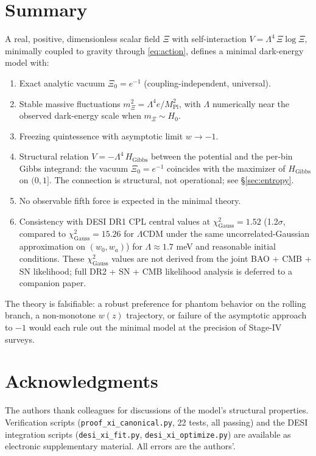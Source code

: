 \documentclass[11pt,reqno]{amsart}
\theoremstyle{plain}
\theoremstyle{definition}
\theoremstyle{remark}
\newcommand{\Pl}{\mathrm{Pl}}
\newcommand{\Gibbs}{\mathrm{Gibbs}}
\begin{document}
\section{Summary}

A real, positive, dimensionless scalar field $\Xi$ with self-interaction
$V = \Lambda^{4}\,\Xi\log\Xi$, minimally coupled to gravity through
\eqref{eq:action}, defines a minimal dark-energy model with:
\begin{enumerate}
  \item Exact analytic vacuum $\Xi_0 = e^{-1}$
        (coupling-independent, universal).
  \item Stable massive fluctuations $m_\Xi^{2} = \Lambda^{4} e / M_\Pl^{2}$,
        with $\Lambda$ numerically near the observed dark-energy scale
        when $m_\Xi \sim H_0$.
  \item Freezing quintessence with asymptotic limit $w \to -1$.
  \item Structural relation $V = -\Lambda^{4}\,H_{\Gibbs}$ between the
        potential and the per-bin Gibbs integrand: the vacuum
        $\Xi_0 = e^{-1}$ coincides with the maximizer of $H_{\Gibbs}$
        on $(0,1]$. The connection is structural, not operational; see
        \S\ref{sec:entropy}.
  \item No observable fifth force is expected in the minimal theory.
  \item Consistency with DESI DR1 CPL central values at
        $\chi^{2}_{\text{Gauss}} = 1.52$ (1.2$\sigma$, compared to
        $\chi^{2}_{\text{Gauss}} = 15.26$ for $\Lambda$CDM under the
        same uncorrelated-Gaussian approximation on $(w_0,w_a)$) for
        $\Lambda \approx 1.7$ meV and reasonable initial conditions.
        These $\chi^{2}_{\text{Gauss}}$ values are not derived from the
        joint BAO + CMB + SN likelihood; full DR2 + SN + CMB likelihood
        analysis is deferred to a companion paper.
\end{enumerate}
The theory is falsifiable: a robust preference for phantom behavior on
the rolling branch, a non-monotone $w(z)$ trajectory, or failure of the
asymptotic approach to $-1$ would each rule out the minimal model at the
precision of Stage-IV surveys.

\section*{Acknowledgments}

The authors thank colleagues for discussions of the model's structural
properties. Verification scripts (\texttt{proof\_xi\_canonical.py}, 22
tests, all passing) and the DESI integration scripts
(\texttt{desi\_xi\_fit.py}, \texttt{desi\_xi\_optimize.py}) are available
as electronic supplementary material. All errors are the authors'.
\end{document}
